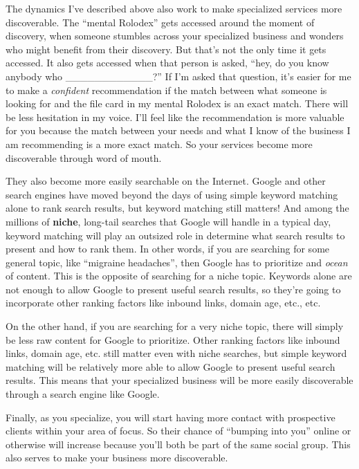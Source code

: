 The dynamics I've described above also work to make specialized services more discoverable. The ``mental Rolodex'' gets accessed around the moment of discovery, when someone stumbles across your specialized business and wonders who might benefit from their discovery. But that's not the only time it gets accessed. It also gets accessed when that person is asked, ``hey, do you know anybody who \_\_\_\_\_\_\_\_\_\_\_\_?'' If I'm asked that question, it's easier for me to make a \emph{confident} recommendation if the match between what someone is looking for and the file card in my mental Rolodex is an exact match. There will be less hesitation in my voice. I'll feel like the recommendation is more valuable for you because the match between your needs and what I know of the business I am recommending is a more exact match. So your services become more discoverable through word of mouth.

They also become more easily searchable on the Internet. Google and other search engines have moved beyond the days of using simple keyword matching alone to rank search results, but keyword matching still matters! And among the millions of \textbf{niche}, long-tail searches that Google will handle in a typical day, keyword matching will play an outsized role in determine what search results to present and how to rank them. In other words, if you are searching for some general topic, like ``migraine headaches'', then Google has to prioritize and \emph{ocean} of content. This is the opposite of searching for a niche topic. Keywords alone are not enough to allow Google to present useful search results, so they're going to incorporate other ranking factors like inbound links, domain age, etc., etc.

On the other hand, if you are searching for a very niche topic, there will simply be less raw content for Google to prioritize. Other ranking factors like inbound links, domain age, etc. still matter even with niche searches, but simple keyword matching will be relatively more able to allow Google to present useful search results. This means that your specialized business will be more easily discoverable through a search engine like Google.

Finally, as you specialize, you will start having more contact with prospective clients within your area of focus. So their chance of ``bumping into you'' online or otherwise will increase because you'll both be part of the same social group. This also serves to make your business more discoverable.

